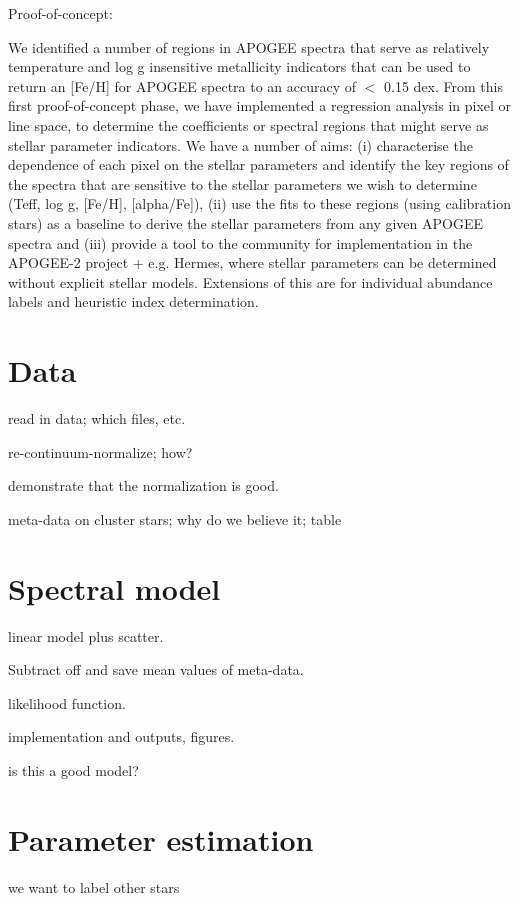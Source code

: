 \documentclass[12pt, preprint]{aastex}
\begin{document}
Proof-of-concept: 

We identified a number of regions in APOGEE spectra that serve as relatively temperature and log g insensitive metallicity indicators that can be used to return an [Fe/H] for APOGEE spectra to an accuracy of $<$ 0.15 dex. From this first proof-of-concept phase, we have implemented a regression analysis in pixel or line space, to determine the coefficients or spectral regions that might serve as stellar parameter indicators.  We have a number of aims: (i) characterise the dependence of each pixel on the stellar parameters and identify the key regions of the spectra that are sensitive to the stellar parameters we wish to determine (Teff, log g, [Fe/H], [alpha/Fe]), (ii) use the fits to these regions (using calibration stars) as a baseline to derive the stellar parameters from any given APOGEE spectra and (iii) provide a tool to the community for implementation in the APOGEE-2 project + e.g. Hermes, where stellar parameters can be determined without explicit stellar models. Extensions of this are for individual abundance labels and heuristic index determination.\\

\section{Data}

read in data; which files, etc.

re-continuum-normalize; how?

demonstrate that the normalization is good.

meta-data on cluster stars; why do we believe it; table

\section{Spectral model}

linear model plus scatter.

Subtract off and save mean values of meta-data.

likelihood function.

implementation and outputs, figures.

is this a good model?

\section{Parameter estimation}

we want to label other stars
\end{document}
